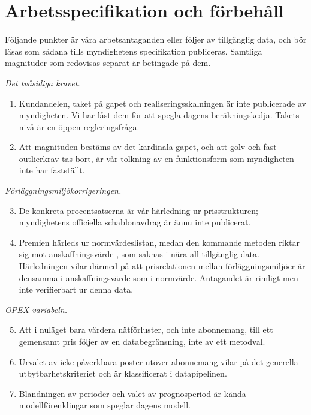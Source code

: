\documentclass[11pt,a4paper]{article}
\begin{document}
\section{Arbetsspecifikation och förbehåll}

Följande punkter är våra arbetsantaganden eller följer av tillgänglig data, och bör läsas som sådana
tills myndighetens specifikation publiceras. Samtliga magnituder som redovisas separat är betingade
på dem.

\textit{Det tvåsidiga kravet.}
\begin{enumerate}
  \item Kundandelen, taket på gapet och realiseringsskalningen är inte publicerade av myndigheten.
    Vi har låst dem för att spegla dagens beräkningskedja. Takets nivå är en öppen regleringsfråga.
  \item Att magnituden bestäms av det kardinala gapet, och att golv och fast outlierkrav tas bort,
    är vår tolkning av en funktionsform som myndigheten inte har fastställt.
\end{enumerate}

\textit{Förläggningsmiljökorrigeringen.}
\begin{enumerate}\setcounter{enumi}{2}
  \item De konkreta procentsatserna är vår härledning ur prisstrukturen; myndighetens officiella
    schablonavdrag är ännu inte publicerat.
  \item Premien härleds ur normvärdeslistan, medan den kommande metoden riktar sig mot
    anskaffningsvärde \citep{Ei2025Inriktning}, som saknas i nära all tillgänglig data. Härledningen vilar därmed på att
    prisrelationen mellan förläggningsmiljöer är densamma i anskaffningsvärde som i normvärde.
    Antagandet är rimligt men inte verifierbart ur denna data.
\end{enumerate}

\textit{OPEX-variabeln.}
\begin{enumerate}\setcounter{enumi}{4}
  \item Att i nuläget bara värdera nätförluster, och inte abonnemang, till ett gemensamt pris följer
    av en databegränsning, inte av ett metodval.
  \item Urvalet av icke-påverkbara poster utöver abonnemang vilar på det generella
    utbytbarhetskriteriet och är klassificerat i datapipelinen.
  \item Blandningen av perioder och valet av prognosperiod är kända modellförenklingar som speglar
    dagens modell.
\end{enumerate}
\end{document}
